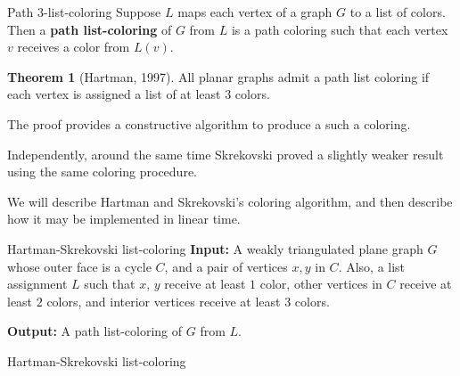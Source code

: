 \documentclass[pdf]{beamer}
\theoremstyle{definition}
\newtheorem{thm}{Theorem}
\theoremstyle{definition}
\theoremstyle{definition}
\theoremstyle{definition}
\theoremstyle{definition}
\theoremstyle{definition}
\theoremstyle{definition}
\theoremstyle{definition}
\theoremstyle{definition}
\theoremstyle{definition}
\theoremstyle{definition}
\theoremstyle{definition}
\begin{document}
\begin{frame}{Path $3$-list-coloring}
Suppose $L$ maps each vertex of a graph $G$ to a list of colors. Then a
\textbf{path list-coloring} of $G$ from $L$ is a path coloring such that each
vertex $v$ receives a color from $L(v)$.

\begin{thm}[Hartman, 1997]
All planar graphs admit a path list coloring if each vertex is assigned a list
of at least $3$ colors.
\end{thm}

The proof provides a constructive algorithm to produce a such a coloring.

Independently, around the same time Skrekovski proved a slightly weaker result
using the same coloring procedure.

We will describe Hartman and Skrekovski's coloring algorithm, and then
describe how it may be implemented in linear time.
\end{frame}


\begin{frame}{Hartman-Skrekovski list-coloring}
\textbf{Input:} A weakly triangulated plane graph $G$ whose outer face is a
cycle $C$, and a pair of vertices $x,y$ in $C$. Also, a list assignment $L$
such that $x$, $y$ receive at least $1$ color, other vertices in $C$ receive
at least $2$ colors, and interior vertices receive at least $3$ colors.

\textbf{Output:} A path list-coloring of $G$ from $L$.
\end{frame}

\begin{frame}{Hartman-Skrekovski list-coloring}
\begin{center}
\end{center}
\end{frame}
\end{document}
